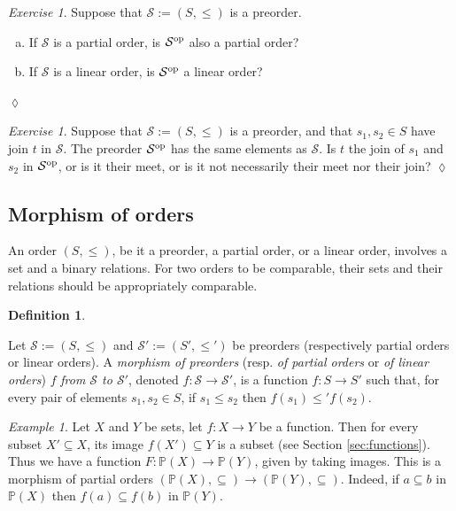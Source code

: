 \documentclass{book}
\def\tn{\textnormal}
\def\mc{\mathcal}
\def\PP{{\mathbb P}}
\def\to{\rightarrow}
\def\taking{\colon}
\def\ss{\subseteq}
\def\op{^\tn{op}}
\def\mcS{\mc{S}}
\theoremstyle{remark}
\newtheorem{example}[subsubsection]{Example}
\newtheorem{exc}[subsubsection]{Exercise}
\newenvironment{exercise}{\begin{exc}}{\hspace*{\fill}$\lozenge$\end{exc}}
\theoremstyle{definition}
\newtheorem{definition}[subsubsection]{Definition}
\def\sexc{\begin{enumerate}[a.)]\setlength{\itemsep}{.1cm}\setlength{\parskip}{.1cm}\item}
\def\next{\item}
\def\endsexc{\end{enumerate}}
\begin{document}
\begin{exercise}
Suppose that $\mcS:=(S,\leq)$ is a preorder. 
\sexc If $\mcS$ is a partial order, is $\mcS\op$ also a partial order? 
\next If $\mcS$ is a linear order, is $\mcS\op$ a linear order?
\endsexc
\end{exercise}

\begin{exercise}
Suppose that $\mcS:=(S,\leq)$ is a preorder, and that $s_1,s_2\in S$ have join $t$ in $\mcS$. The preorder $\mcS\op$ has the same elements as $\mcS$. Is $t$ the join of $s_1$ and $s_2$ in $\mcS\op$, or is it their meet, or is it not necessarily their meet nor their join?
\end{exercise}


\subsection{Morphism of orders}

An order $(S,\leq)$, be it a preorder, a partial order, or a linear order, involves a set and a binary relations. For two orders to be comparable, their sets and their relations should be appropriately comparable.

\begin{definition}\label{def:morphism of orders}

Let $\mcS:=(S,\leq)$ and $\mcS':=(S',\leq')$ be preorders (respectively partial orders or linear orders). A {\em morphism of preorders} (resp. {\em of partial orders} or {\em of linear orders}) $f$ {\em from $\mcS$ to $\mcS'$}, denoted $f\taking\mcS\to\mcS'$, is a function $f\taking S\to S'$ such that, for every pair of elements $s_1,s_2\in S$, if $s_1\leq s_2$ then $f(s_1)\leq' f(s_2)$.

\end{definition}

\begin{example}

Let $X$ and $Y$ be sets, let $f\taking X\to Y$ be a function. Then for every subset $X'\ss X$, its image $f(X')\ss Y$ is a subset (see Section \ref{sec:functions}). Thus we have a function $F\taking\PP(X)\to\PP(Y)$, given by taking images. This is a morphism of partial orders $(\PP(X),\ss)\to(\PP(Y),\ss)$. Indeed, if $a\ss b$ in $\PP(X)$ then $f(a)\ss f(b)$ in $\PP(Y)$.

\end{example}
\end{document}
